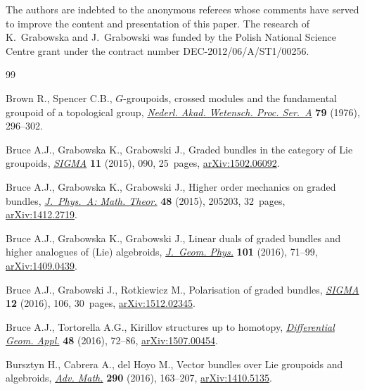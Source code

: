 \documentclass[10pt,a4paper]{amsart}
\numberwithin{equation}{section}
\begin{document}
The authors are indebted to the anonymous referees whose comments have served to improve the content and presentation of this paper. The research of K.~Grabowska and J.~Grabowski was funded by the Polish National Science Centre grant under the contract number DEC-2012/06/A/ST1/00256.


\begin{thebibliography}{99}
\footnotesize\itemsep=0pt

Brown R., Spencer C.B., {$G$}-groupoids, crossed modules and the fundamental
 groupoid of a topological group, \href{https://doi.org/10.1016/1385-7258(76)90068-8}{\textit{Nederl. Akad. Wetensch. Proc.
 Ser.~A}} \textbf{79} (1976), 296--302.

Bruce A.J., Grabowska K., Grabowski J., Graded bundles in the category of {L}ie
 groupoids, \href{https://doi.org/10.3842/SIGMA.2015.090}{\textit{SIGMA}} \textbf{11} (2015), 090, 25~pages,
 \href{https://arxiv.org/abs/1502.06092}{arXiv:1502.06092}.

Bruce A.J., Grabowska K., Grabowski J., Higher order mechanics on graded
 bundles, \href{https://doi.org/10.1088/1751-8113/48/20/205203}{\textit{J.~Phys.~A: Math. Theor.}} \textbf{48} (2015), 205203,
 32~pages, \href{https://arxiv.org/abs/1412.2719}{arXiv:1412.2719}.

Bruce A.J., Grabowska K., Grabowski J., Linear duals of graded bundles and
 higher analogues of ({L}ie) algebroids, \href{https://doi.org/10.1016/j.geomphys.2015.12.004}{\textit{J.~Geom. Phys.}} \textbf{101}
 (2016), 71--99, \href{https://arxiv.org/abs/1409.0439}{arXiv:1409.0439}.

Bruce A.J., Grabowski J., Rotkiewicz M., Polarisation of graded bundles,
 \href{https://doi.org/10.3842/SIGMA.2016.106}{\textit{SIGMA}} \textbf{12} (2016), 106, 30~pages, \href{https://arxiv.org/abs/1512.02345}{arXiv:1512.02345}.

Bruce A.J., Tortorella A.G., Kirillov structures up to homotopy,
 \href{https://doi.org/10.1016/j.difgeo.2016.06.005}{\textit{Differential Geom. Appl.}} \textbf{48} (2016), 72--86,
 \href{https://arxiv.org/abs/1507.00454}{arXiv:1507.00454}.

Bursztyn H., Cabrera A., del Hoyo M., Vector bundles over {L}ie groupoids and
 algebroids, \href{https://doi.org/10.1016/j.aim.2015.11.044}{\textit{Adv. Math.}} \textbf{290} (2016), 163--207,
 \href{https://arxiv.org/abs/1410.5135}{arXiv:1410.5135}.


\end{thebibliography}
\end{document}
